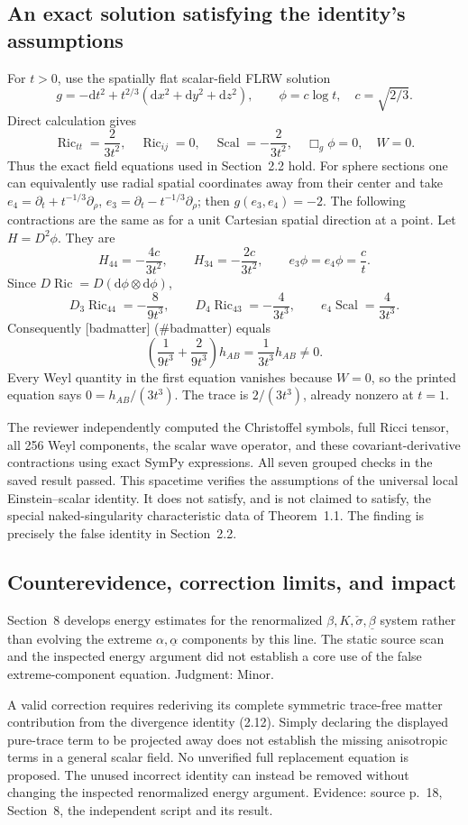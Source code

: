 \documentclass[10pt]{article}
\begin{document}
\subsection*{An exact solution satisfying the identity’s assumptions}
For \(t>0\), use the spatially flat scalar-field FLRW solution \[g=-\mathrm dt^2+t^{2/3}(\mathrm dx^2+\mathrm dy^2+\mathrm dz^2),\qquad
 \phi=c\log t,\quad c=\sqrt{2/3}.\] Direct calculation gives \[\operatorname{Ric}_{tt}=\frac{2}{3t^2},\quad \operatorname{Ric}_{ij}=0,\quad
 \operatorname{Scal}=-\frac{2}{3t^2},\quad \Box_g\phi=0,\quad W=0.\] Thus the exact field equations used in Section 2.2 hold. For sphere sections one can equivalently use radial spatial coordinates away from their center and take \(e_4=\partial_t+t^{-1/3}\partial_\rho\), \(e_3=\partial_t-t^{-1/3}\partial_\rho\); then \(g(e_3,e_4)=-2\). The following contractions are the same as for a unit Cartesian spatial direction at a point. Let \(H=D^2\phi\). They are \[H_{44}=-\frac{4c}{3t^2},\qquad
 H_{34}=-\frac{2c}{3t^2},\qquad
 e_3\phi=e_4\phi=\frac ct.\] Since \(D\operatorname{Ric}=D(\mathrm d\phi\otimes\mathrm d\phi)\), \[D_3\operatorname{Ric}_{44}=-\frac8{9t^3},\qquad
 D_4\operatorname{Ric}_{43}=-\frac4{3t^3},\qquad
 e_4\operatorname{Scal}=\frac4{3t^3}.\] Consequently [badmatter] (\#badmatter) equals \[\left(\frac1{9t^3}+\frac2{9t^3}\right)h_{AB}
 =\frac1{3t^3}h_{AB}\ne0.\] Every Weyl quantity in the first equation vanishes because \(W=0\), so the printed equation says \(0=h_{AB}/(3t^3)\). The trace is \(2/(3t^3)\), already nonzero at \(t=1\).\par
The reviewer independently computed the Christoffel symbols, full Ricci tensor, all 256 Weyl components, the scalar wave operator, and these covariant-derivative contractions using exact SymPy expressions. All seven grouped checks in the saved result passed. This spacetime verifies the assumptions of the universal local Einstein–scalar identity. It does not satisfy, and is not claimed to satisfy, the special naked-singularity characteristic data of Theorem 1.1. The finding is precisely the false identity in Section 2.2.\par
\subsection*{Counterevidence, correction limits, and impact}
Section 8 develops energy estimates for the renormalized \(\beta,K,\check\sigma,\underline\beta\) system rather than evolving the extreme \(\alpha,\underline\alpha\) components by this line. The static source scan and the inspected energy argument did not establish a core use of the false extreme-component equation. Judgment: Minor.\par
A valid correction requires rederiving its complete symmetric trace-free matter contribution from the divergence identity (2.12). Simply declaring the displayed pure-trace term to be projected away does not establish the missing anisotropic terms in a general scalar field. No unverified full replacement equation is proposed. The unused incorrect identity can instead be removed without changing the inspected renormalized energy argument. Evidence: source p. 18, Section 8, the independent script and its result.\par
\end{document}
